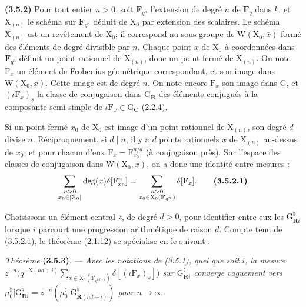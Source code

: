 \documentclass[11pt,leqno]{article}
\begin{document}
\textbf{(3.5.2)} Pour tout entier \(n>0\), soit \(\mathbf F_{q^n}\) l’extension de degré \(n\) de \(\mathbf F_q\) dans \(\bar k\), et \(\mathrm X_{(n)}\) le schéma sur \(\mathbf F_{q^n}\) déduit de \(\mathrm X_0\) par extension des scalaires. Le schéma \(\mathrm X_{(n)}\) est un revêtement de \(\mathrm X_0\); il correspond au sous-groupe de \(\mathrm W(\mathrm X_0,\bar x)\) formé des éléments de degré divisible par \(n\). Chaque point \(x\) de \(\mathrm X_0\) à coordonnées dans \(\mathbf F_{q^n}\) définit un point rationnel de \(\mathrm X_{(n)}\), donc un point fermé de \(\mathrm X_{(n)}\). On note \(\mathrm F_x\) un élément de Frobenius géométrique correspondant, et son image dans \(\mathrm W(\mathrm X_0,\bar x)\). Cette image est de degré \(n\). On note encore \(\mathrm F_x\) son image dans \(\mathrm G\), et \((\iota\mathrm F_x)_s\) la classe de conjugaison dans \(\mathrm G_{\mathbf R}\) des éléments conjugués à la composante semi-simple de \(\iota\mathrm F_x\in\mathrm G_{\mathbf C}\) (2.2.4).

Si un point fermé \(x_0\) de \(\mathrm X_0\) est image d’un point rationnel de \(\mathrm X_{(n)}\), son degré \(d\) divise \(n\). Réciproquement, si \(d\mid n\), il y a \(d\) points rationnels \(x\) de \(\mathrm X_{(n)}\) au-dessus de \(x_0\), et pour chacun d’eux \(\mathrm F_x=\mathrm F_{x_0}^{n/d}\) (à conjugaison près). Sur l’espace des classes de conjugaison dans \(\mathrm W(\mathrm X_0,x)\), on a donc une identité entre mesures :
\[
\sum_{\substack{n>0\\x_0\in|\mathrm X_0|}}
\deg(x)\delta[\mathrm F_{x_0}^{n}]
=
\sum_{\substack{n>0\\x_0\in\mathrm X_0(\mathbf F_{q^n})}}
\delta[\mathrm F_x].
\tag*{\textbf{(3.5.2.1)}}
\]

Choisissons un élément central \(z\), de degré \(d>0\), pour identifier entre eux les \(\mathrm G_{\mathbf R i}^{\natural}\) lorsque \(i\) parcourt une progression arithmétique de raison \(d\). Compte tenu de (3.5.2.1), le théorème (2.1.12) se spécialise en le suivant :

\textit{Théorème} \textbf{(3.5.3)}. — \textit{Avec les notations de (3.5.1), quel que soit \(i\), la mesure \(\displaystyle z^{-n}\bigl(q^{-\mathrm N(nd+i)}\sum_{x\in\mathrm X_0(\mathbf F_{q^{nd+i}})}\delta[(\iota\mathrm F_x)_s]\bigr)\) sur \(\mathrm G_{\mathbf R i}^{\natural}\) converge vaguement vers \(\mu_0^{\natural}\vert\mathrm G_{\mathbf R i}^{\natural}=z^{-n}(\mu_0^{\natural}\vert\mathrm G_{\mathbf R(nd+i)}^{\natural})\) pour \(n\to\infty\).}
\end{document}
